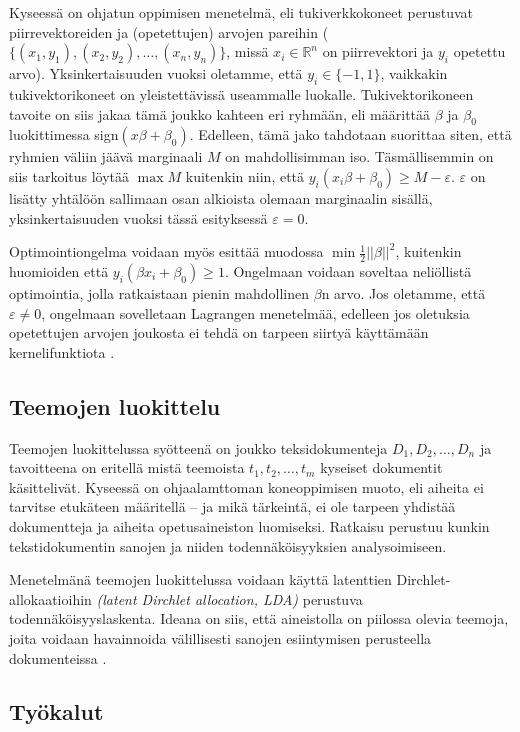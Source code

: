 \documentclass[finnish,gradu,twoside,12pt]{tktltiki}
\begin{document}
{Kyseessä on ohjatun oppimisen menetelmä, eli tukiverkkokoneet perustuvat piirrevektoreiden ja (opetettujen) arvojen pareihin ($\{ (x_1, y_1), (x_2, y_2), \ldots, (x_n, y_n) \}$, missä $x_i \in \mathbb{R}^n$ on piirrevektori ja $y_i$ opetettu arvo). Yksinkertaisuuden vuoksi oletamme, että $y_i \in \{ -1, 1 \}$, vaikkakin tukivektorikoneet on yleistettävissä useammalle luokalle. Tukivektorikoneen tavoite on siis jakaa tämä joukko kahteen eri ryhmään, eli määrittää $\beta$ ja $\beta_0$ luokittimessa sign$( x \beta + \beta_0)$. Edelleen, tämä jako tahdotaan suorittaa siten, että ryhmien väliin jäävä marginaali $M$ on mahdollisimman iso. Täsmällisemmin on siis tarkoitus löytää $\max M$ kuitenkin niin, että $y_i( x_i \beta + \beta_0 ) \geq M - \varepsilon$. $\varepsilon$ on lisätty yhtälöön sallimaan osan alkioista olemaan marginaalin sisällä, yksinkertaisuuden vuoksi tässä esityksessä $\varepsilon = 0$.

Optimointiongelma voidaan myös esittää muodossa $ \min \frac{1}{2} || \beta ||^2 $, kuitenkin huomioiden että $ y_i( \beta x_i + \beta_0 ) \geq 1$. Ongelmaan voidaan soveltaa neliöllistä optimointia, jolla ratkaistaan pienin mahdollinen $\beta$n arvo. Jos oletamme, että $\varepsilon \neq 0$, ongelmaan  sovelletaan Lagrangen menetelmää, edelleen jos oletuksia opetettujen arvojen joukosta ei tehdä on tarpeen siirtyä käyttämään kernelifunktiota \citep{Hastie2009}.

\subsection{Teemojen luokittelu}

Teemojen luokittelussa syötteenä on joukko teksidokumenteja $D_1, D_2, \ldots, D_n$ ja tavoitteena on eritellä mistä teemoista $t_1, t_2, \ldots, t_m$ kyseiset dokumentit käsittelivät. Kyseessä on ohjaalamttoman koneoppimisen muoto, eli aiheita ei tarvitse etukäteen määritellä -- ja mikä tärkeintä, ei ole tarpeen yhdistää dokumentteja ja aiheita opetusaineiston luomiseksi. Ratkaisu perustuu kunkin tekstidokumentin sanojen ja niiden todennäköisyyksien analysoimiseen.

Menetelmänä teemojen luokittelussa voidaan käyttä latenttien Dirchlet-allokaatioihin \textit{(latent Dirchlet allocation, LDA)} perustuva todennäköisyyslaskenta. Ideana on siis, että aineistolla on piilossa olevia teemoja, joita voidaan havainnoida välillisesti sanojen esiintymisen perusteella dokumenteissa \citep{Blei2010,Blei2003}.

\subsection*{Työkalut}

}
\end{document}
